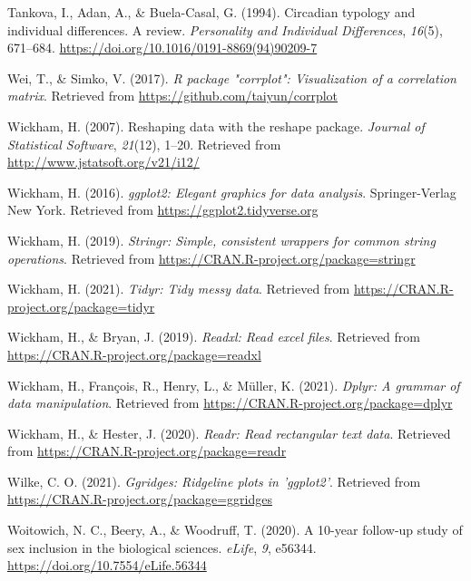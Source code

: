 \documentclass[
  english,
  jou,floatsintext]{apa6}
\newlength{\cslhangindent}
\newenvironment{CSLReferences}[2] %
 {%
  \setlength{\parindent}{0pt}
  \ifodd #1 \everypar{\setlength{\hangindent}{\cslhangindent}}\ignorespaces\fi
  \ifnum #2 > 0
  \setlength{\parskip}{#2\baselineskip}
  \fi
 }%
 {}
\begin{document}
\begin{CSLReferences}{1}{0}
\leavevmode{}%
Tankova, I., Adan, A., \& Buela-Casal, G. (1994). Circadian typology and individual differences. {A} review. \emph{Personality and Individual Differences}, \emph{16}(5), 671--684. \url{https://doi.org/10.1016/0191-8869(94)90209-7}

\leavevmode{}%
Wei, T., \& Simko, V. (2017). \emph{R package "corrplot": Visualization of a correlation matrix}. Retrieved from \url{https://github.com/taiyun/corrplot}

\leavevmode{}%
Wickham, H. (2007). Reshaping data with the {reshape} package. \emph{Journal of Statistical Software}, \emph{21}(12), 1--20. Retrieved from \url{http://www.jstatsoft.org/v21/i12/}

\leavevmode{}%
Wickham, H. (2016). \emph{ggplot2: Elegant graphics for data analysis}. Springer-Verlag New York. Retrieved from \url{https://ggplot2.tidyverse.org}

\leavevmode{}%
Wickham, H. (2019). \emph{Stringr: Simple, consistent wrappers for common string operations}. Retrieved from \url{https://CRAN.R-project.org/package=stringr}

\leavevmode{}%
Wickham, H. (2021). \emph{Tidyr: Tidy messy data}. Retrieved from \url{https://CRAN.R-project.org/package=tidyr}

\leavevmode{}%
Wickham, H., \& Bryan, J. (2019). \emph{Readxl: Read excel files}. Retrieved from \url{https://CRAN.R-project.org/package=readxl}

\leavevmode{}%
Wickham, H., François, R., Henry, L., \& Müller, K. (2021). \emph{Dplyr: A grammar of data manipulation}. Retrieved from \url{https://CRAN.R-project.org/package=dplyr}

\leavevmode{}%
Wickham, H., \& Hester, J. (2020). \emph{Readr: Read rectangular text data}. Retrieved from \url{https://CRAN.R-project.org/package=readr}

\leavevmode{}%
Wilke, C. O. (2021). \emph{Ggridges: Ridgeline plots in 'ggplot2'}. Retrieved from \url{https://CRAN.R-project.org/package=ggridges}

\leavevmode{}%
Woitowich, N. C., Beery, A., \& Woodruff, T. (2020). A 10-year follow-up study of sex inclusion in the biological sciences. \emph{eLife}, \emph{9}, e56344. \url{https://doi.org/10.7554/eLife.56344}


\end{CSLReferences}
\end{document}
